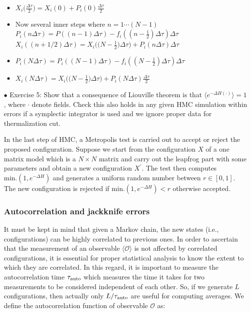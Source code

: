 \documentclass[11pt]{article}
\begin{document}
\begin{itemize}
	\item $X_{i}\big(\frac{\Delta \tau}{2}\big) = X_{i}(0) + P_{i}(0)\frac{\Delta \tau}{2}$
	\item Now several inner steps where $n =  1 \cdots (N-1)$
	\subitem $P_{i}(n \Delta \tau) = P((n-1) \Delta \tau) - f_{i}((n-\frac{1}{2}) \Delta \tau) \Delta \tau$ 
	\subitem $X_{i}((n + 1/2) \Delta \tau) = X_{i}\Big(\Big(N - \frac{1}{2}\Big) \Delta \tau\Big)  + P_{i}(n \Delta \tau) \Delta \tau$
	\item $P_{i}(N \Delta \tau) = P_{i}((N-1) \Delta \tau) - f_{i}((N-\frac{1}{2}) \Delta \tau) \Delta \tau$ 
	\item $X_{i}(N \Delta \tau) = X_{i}\Big(\Big(N - \frac{1}{2}\Big) \Delta \tau\Big) + P_{i}(N \Delta \tau) \frac{\Delta \tau}{2}$ 
\end{itemize} 
    \begin{mdframed}[backgroundcolor=blue!3] 
    \textsc{} 
    $\bullet$ Exercise 5: Show that a consequence of Liouville theorem is that $ \langle e^{-\Delta H(\boldsymbol{\cdot})} \rangle = 1$, where $\boldsymbol{\cdot}$ denote fields. Check this also holds in any given HMC simulation within errors if a symplectic integrator is used and we ignore proper data for thermalization cut.
    \end{mdframed} 
In the last step of HMC, a Metropolis test is carried out to accept or reject the proposed
configuration. Suppose we start from the configuration $X$ of a one matrix model 
which is a $N \times N$ matrix and carry out the leapfrog part with some parameters and obtain a new configuration 
$X^{\prime}$. The test then computes \texttt{$\text{min.}(1, e^{-\Delta H})$} and generates 
a uniform random number between $r \in [0,1]$. The new configuration is 
rejected if \texttt{$\text{min.}(1, e^{-\Delta H}) < r$} otherwise accepted. 


\subsubsection{Autocorrelation and jackknife errors} 

It must be kept in mind that given a Markov chain, the new states 
(i.e., configurations) can be highly correlated to previous ones. 
In order to ascertain that the measurement of an observable $\langle \mathcal{O} \rangle$ is not affected by correlated configurations, it is essential for proper statistical analysis to know the extent to which they are correlated. In this regard, it is important to measure
the autocorrelation time $ \tau_{\rm{auto}}$ which measures the time it takes for two measurements to be considered independent of each other. So, if we generate $L$ configurations, then actually only $L/\tau_{\rm{auto}}$ are useful for computing averages.
We define the autocorrelation function of observable $\mathcal{O}$ as:
 
\end{document}
